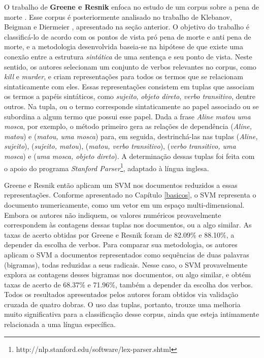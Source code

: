 O trabalho de \textbf{Greene e Resnik} enfoca no estudo de um corpus sobre a pena de morte \cite{greene}. Esse corpus é posteriormente analisado no trabalho de Klebanov, Beigman e Diermeier \cite{klebanov}, apresentado na seção anterior. O objetivo do trabalho é classificá-lo de acordo com os pontos de vista pró pena de morte e anti pena de morte, e a metodologia desenvolvida baseia-se na hipótese de que existe uma conexão entre a estrutura \emph{sintática} de uma sentença e seu ponto de vista. Neste sentido, os autores selecionam um conjunto de verbos relevantes no corpus, como \emph{kill} e \emph{murder}, e criam representações para todos os termos que se relacionam sintaticamente com eles. Essas representações consistem em tuplas que associam os termos a papéis sintáticos, como \emph{sujeito}, \emph{objeto direto}, \emph{verbo transitivo}, dentre outros. Na tupla, ou o termo corresponde sintaticamente ao papel associado ou se subordina a algum termo que possui esse papel. Dada a frase \emph{Aline matou uma mosca}, por exemplo, o método primeiro gera as relações de dependência (\emph{Aline, matou}) e (\emph{matou, uma mosca}) para, em seguida, destrinchá-las nas tuplas (\emph{Aline, sujeito}), (\emph{sujeito, matou}), (\emph{matou, verbo transitivo}), (\emph{verbo transitivo, uma mosca}) e (\emph{uma mosca, objeto direto}). A determinação dessas tuplas foi feita com o apoio do programa \emph{Stanford Parser}\footnote{http://nlp.stanford.edu/software/lex-parser.shtml}, adaptado à língua inglesa. 

Greene e Resnik então aplicam um SVM nos documentos reduzidos a essas representações. Conforme apresentado no Capítulo \ref{basicos}, o SVM representa o documento numericamente, como um vetor em um espaço multi-dimensional. Embora os autores não indiquem, os valores numéricos provavelmente correspondem às contagens dessas tuplas nos documentos, ou a algo similar. As taxas de acerto obtidas por Greene e Resnik foram de 82.09\% e 88.10\%, a depender da escolha de verbos. Para comparar sua metodologia, os autores aplicam o SVM a documentos representados como sequências de duas palavras (bigramas), todas reduzidas a seus radicais. Nesse caso, o SVM provavelmente explora as contagens desses bigramas nos documentos, ou algo similar, e obtém taxas de acerto de 68.37\% e 71.96\%, também a depender da escolha dos verbos. Todos os resultados apresentados pelos autores foram obtidos via validação cruzada de quatro dobras. O uso das tuplas, portanto, trouxe uma melhoria muito significativa para a classificação desse corpus, ainda que esteja intimamente relacionada a uma língua específica.

